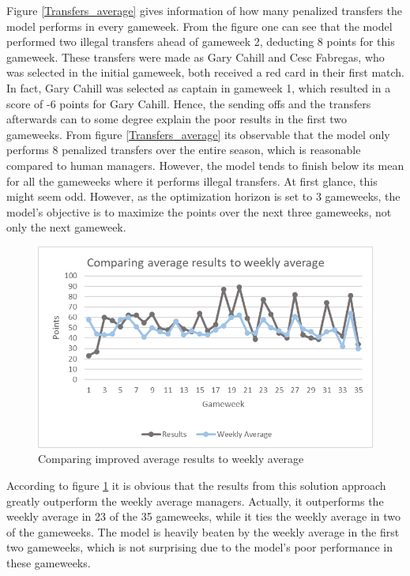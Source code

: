 Figure \ref{Transfers_average} gives information of how many penalized transfers the model performs in every gameweek. From the figure one can see that the model performed two illegal transfers ahead of gameweek 2, deducting 8 points for this gameweek. These transfers were made as Gary Cahill and Cesc Fabregas, who was selected in the initial gameweek, both received a red card in their first match. In fact, Gary Cahill was selected as captain in gameweek 1, which resulted in a score of -6 points for Gary Cahill. Hence, the sending offs and the transfers afterwards can to some degree explain the poor results in the first two gameweeks. From figure \ref{Transfers_average} its observable that the model only performs 8 penalized transfers over the entire season, which is reasonable compared to human managers. However, the model tends to finish below its mean for all the gameweeks where it performs illegal transfers. At first glance, this might seem odd. However, as the optimization horizon is set to 3 gameweeks, the model's objective is to maximize the points over the next three gameweeks, not only the next gameweek. 

\begin{figure}[H]
    \centering
    \includegraphics[scale=0.75]{fig/chapter_7/Comparison_average.png}
    \caption{Comparing improved average results to weekly average}
\label{Comparison_average}    
\end{figure} 
According to figure \ref{Comparison_average} it is obvious that the results from this solution approach greatly outperform the weekly average managers. Actually, it outperforms the weekly average in 23 of the 35 gameweeks, while it ties the weekly average in two of the gameweeks. The model is heavily beaten by the weekly average in the first two gameweeks, which is not surprising due to the model's poor performance in these gameweeks. 

